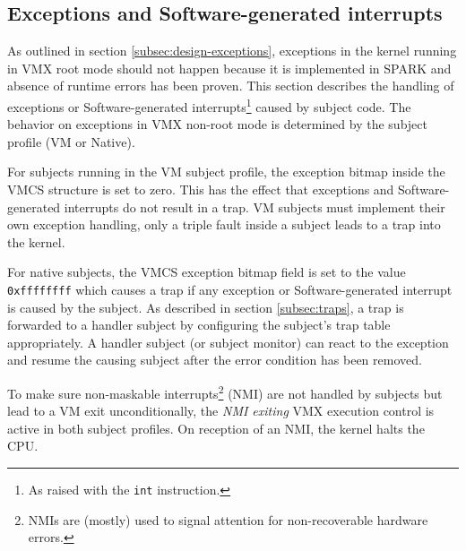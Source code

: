 \subsection{Exceptions and Software-generated interrupts}
As outlined in section \ref{subsec:design-exceptions}, exceptions in the kernel
running in VMX root mode should not happen because it is implemented in SPARK
and absence of runtime errors has been proven.  This section describes the
handling of exceptions or Software-generated interrupts\footnote{As raised with
the \texttt{int} instruction.} caused by subject code. The behavior on
exceptions in VMX non-root mode is determined by the subject profile (VM or
Native).

For subjects running in the VM subject profile, the exception bitmap inside the
VMCS structure is set to zero. This has the effect that exceptions and
Software-generated interrupts do not result in a trap. VM subjects must
implement their own exception handling, only a triple fault inside a subject
leads to a trap into the kernel.

For native subjects, the VMCS exception bitmap field is set to the value
\texttt{0xffffffff} which causes a trap if any exception or Software-generated
interrupt is caused by the subject. As described in section \ref{subsec:traps},
a trap is forwarded to a handler subject by configuring the subject's trap table
appropriately. A handler subject (or subject monitor) can react to the exception
and resume the causing subject after the error condition has been removed.

To make sure non-maskable interrupts\footnote{NMIs are (mostly) used to signal
attention for non-recoverable hardware errors.} (NMI) are not
handled by subjects but lead to a VM exit unconditionally, the \emph{NMI
exiting} VMX execution control is active in both subject profiles. On reception
of an NMI, the kernel halts the CPU.
